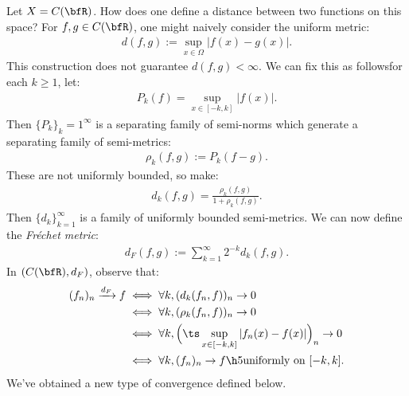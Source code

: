     \begin{example}
        Let $X = C(\bfR)$. How does one define a distance between two functions on this space? For $f,g \in C(\bfR)$, one might naively consider the uniform metric:
            \begin{equation*}
            \begin{split}
                d(f,g) := \sup_{x \in \Omega}|f(x) - g(x)|.
            \end{split}
            \end{equation*}
        This construction does not guarantee $d(f,g) < \infty$. We can fix this as follows\textemdash for each $k \geq 1$, let:
            \begin{equation*}
            \begin{split}
                P_k(f) = \sup_{x \in [-k,k]}|f(x)|.
            \end{split}
            \end{equation*}
        Then $\{P_k\}_k = 1^\infty$ is a separating family of semi-norms which generate a separating family of semi-metrics:
            \begin{equation*}
            \begin{split}
                \rho_k(f,g) := P_k(f-g).
            \end{split}
            \end{equation*}
        These are not uniformly bounded, so make:
            \begin{equation*}
            \begin{split}
                d_k(f,g) = \frac{\rho_k(f,g)}{1 + \rho_k(f,g)}.
            \end{split}
            \end{equation*}
        Then $\{d_k\}_{k=1}^\infty$ is a family of uniformly bounded semi-metrics. We can now define the \textit{Fr\'echet metric}:
            \begin{equation*}
            \begin{split}
                d_F(f,g) := \sum_{k = 1}^\infty 2^{-k}d_k(f,g).
            \end{split}
            \end{equation*}
        In $(C(\bfR),d_F)$, observe that:
            \begin{equation*}
            \begin{split}
                (f_n)_n \xrightarrow{d_F}f 
                &\iff \forall k, (d_k(f_n,f))_n \rightarrow 0 \\
                &\iff \forall k, (\rho_k(f_n,f))_n \rightarrow 0 \\
                &\iff \forall k, \Bigl(\ts \sup_{x \in [-k,k]}|f_n(x) - f(x)|\Bigr)_n \rightarrow 0 \\
                &\iff \forall k, (f_n)_n \rightarrow f \h5\text{uniformly on $[-k,k]$}.
            \end{split}
            \end{equation*}
        We've obtained a new type of convergence defined below.
    \end{example}

